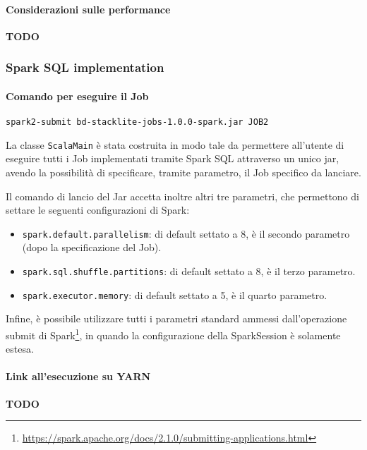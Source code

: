   \paragraph{Considerazioni sulle performance}\label{par:job2:mapreduce:performance}

  \textbf{TODO}

  \subsubsection{Spark SQL implementation}\label{subsub:job2:spark}

  \paragraph{Comando per eseguire il Job}\label{par:job2:spark:cmd}

  \texttt{spark2-submit bd-stacklite-jobs-1.0.0-spark.jar JOB2}

  La classe \texttt{ScalaMain} è stata costruita in modo tale da permettere all'utente di eseguire tutti i Job implementati tramite
  Spark SQL attraverso un unico jar, avendo la possibilità di specificare, tramite parametro, il Job specifico da lanciare.

  Il comando di lancio del Jar accetta inoltre altri tre parametri, che permettono di settare le seguenti configurazioni di Spark\@:
  \begin{itemize}
    \item \texttt{spark.default.parallelism}: di default settato a 8, è il secondo parametro (dopo la specificazione del Job).
    \item \texttt{spark.sql.shuffle.partitions}: di default settato a 8, è il terzo parametro.
    \item \texttt{spark.executor.memory}: di default settato a 5, è il quarto parametro.
  \end{itemize}

  Infine, è possibile utilizzare tutti i parametri standard ammessi dall'operazione submit di Spark\footnote{\url{https://spark.apache.org/docs/2.1.0/submitting-applications.html}},
  in quando la configurazione della SparkSession è solamente estesa.

  \paragraph{Link all'esecuzione su YARN}\label{par:job2:spark:yarn}

  \textbf{TODO}

